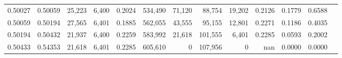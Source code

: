 \begin{tabular}{rrrrrrrrrrrrr}
0.50027 & 0.50059 & 25,223 & 6,400 &                                     0.2024 & 534,490 &  71,120 &  88,754 &  19,202 & 0.2126 & 0.1779 & 0.6588 \\
0.50059 & 0.50194 & 27,565 & 6,401 &                                     0.1885 & 562,055 &  43,555 &  95,155 &  12,801 & 0.2271 & 0.1186 & 0.4035 \\
0.50194 & 0.50432 & 21,937 & 6,400 &                                     0.2259 & 583,992 &  21,618 & 101,555 &   6,401 & 0.2285 & 0.0593 & 0.2002 \\
0.50433 & 0.54353 & 21,618 & 6,401 &                                     0.2285 & 605,610 &       0 & 107,956 &       0 &    nan & 0.0000 & 0.0000 \\
\bottomrule
\end{tabular}
